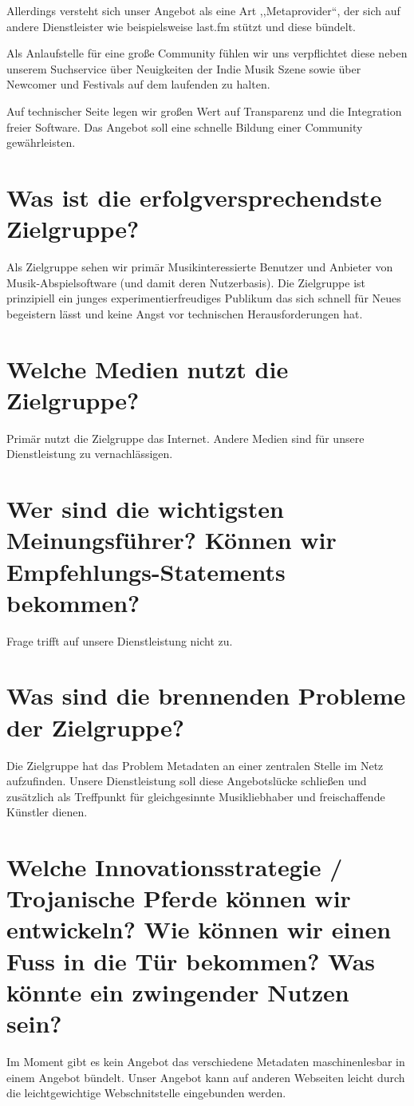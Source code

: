 \documentclass[11pt]{scrreprt}
\begin{document}
Allerdings versteht sich unser Angebot als eine Art ,,Metaprovider``, der sich
auf andere Dienstleister wie beispielsweise last.fm stützt und diese bündelt.

Als Anlaufstelle für eine große Community fühlen wir uns verpflichtet diese
neben unserem Suchservice über Neuigkeiten der Indie Musik Szene sowie über
Newcomer und Festivals auf dem laufenden zu halten. 

Auf technischer Seite legen wir großen Wert auf Transparenz und die Integration
freier Software. Das Angebot soll eine schnelle Bildung einer Community
gewährleisten.


\section{Was ist die erfolgversprechendste Zielgruppe?}
Als Zielgruppe sehen wir primär Musikinteressierte Benutzer und Anbieter von
Musik-Abspielsoftware (und damit deren Nutzerbasis).
Die Zielgruppe ist prinzipiell ein junges experimentierfreudiges Publikum das
sich schnell für Neues begeistern lässt und keine Angst vor technischen Herausforderungen hat.


\section{Welche Medien nutzt die Zielgruppe?}
Primär nutzt die Zielgruppe das Internet. Andere Medien sind für unsere
Dienstleistung zu vernachlässigen.


\section{Wer sind die wichtigsten Meinungsführer?
Können wir Empfehlungs-Statements bekommen?}
Frage trifft auf unsere Dienstleistung nicht zu.


\section{Was sind die brennenden Probleme der
Zielgruppe?}
Die Zielgruppe hat das Problem Metadaten an einer zentralen Stelle im Netz
aufzufinden. Unsere Dienstleistung soll diese Angebotslücke schließen und
zusätzlich als Treffpunkt für gleichgesinnte Musikliebhaber und freischaffende
Künstler dienen.


\section{Welche Innovationsstrategie / Trojanische Pferde können wir entwickeln?
    Wie können wir einen Fuss in die Tür bekommen?
Was könnte ein zwingender Nutzen sein?}
Im Moment gibt es kein Angebot das verschiedene Metadaten maschinenlesbar 
in einem Angebot bündelt. Unser Angebot kann auf anderen Webseiten leicht durch
die leichtgewichtige Webschnitstelle eingebunden werden.
\end{document}
